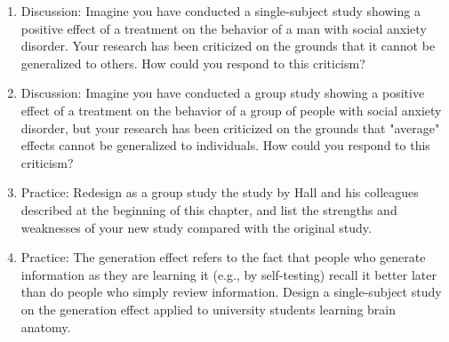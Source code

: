 \begin{fullwidth}
\begin{enumerate}

\item Discussion: Imagine you have conducted a single-subject study showing a positive effect of a treatment on the behavior of a man with social anxiety disorder. Your research has been criticized on the grounds that it cannot be generalized to others. How could you respond to this criticism?
\item Discussion: Imagine you have conducted a group study showing a positive effect of a treatment on the behavior of a group of people with social anxiety disorder, but your research has been criticized on the grounds that "average" effects cannot be generalized to individuals. How could you respond to this criticism?
\item  Practice: Redesign as a group study the study by Hall and his colleagues described at the beginning of this chapter, and list the strengths and weaknesses of your new study compared with the original study.
\item Practice: The generation effect refers to the fact that people who generate information as they are learning it (e.g., by self-testing) recall it better later than do people who simply review information. Design a single-subject study on the generation effect applied to university students learning brain anatomy.
\end{enumerate}
\end{fullwidth}
